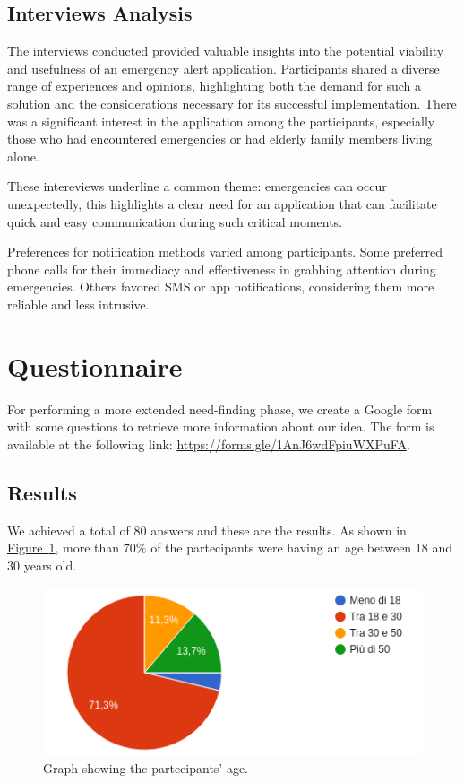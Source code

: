 \documentclass[12pt]{article}
\begin{document}
\subsection{Interviews Analysis}
The interviews conducted provided valuable insights into the potential 
viability and usefulness of an emergency alert application. Participants 
shared a diverse range of experiences and opinions, highlighting both the
demand for such a solution and the considerations necessary for its 
successful implementation. There was a significant interest in the 
application among the participants, especially those who had encountered 
emergencies or had elderly family members living alone.

These intereviews underline a common theme: emergencies can occur 
unexpectedly, this highlights a clear need for an application 
that can facilitate quick and easy communication during such critical 
moments.

Preferences for notification methods varied among participants. 
Some preferred phone calls for their immediacy and effectiveness in 
grabbing attention during emergencies. Others favored SMS or app 
notifications, considering them more reliable and less intrusive. 

\section{Questionnaire}
For performing a more extended need-finding phase, we create a Google form 
with some questions to retrieve more information about our idea. The form 
is available at the following link: \url{https://forms.gle/1AnJ6wdFpiuWXPuFA}.

\subsection{Results}
We achieved a total of 80 answers and these are the results. As shown in 
\hyperref[fig:age]{Figure~\ref*{fig:age}}, more than $70\%$ of the partecipants
were having an age between 18 and 30 years old. 
 
\begin{figure}[h]
    \centering
    \includegraphics[width=.5\textwidth]{Images/age.png}
    \caption{Graph showing the partecipants' age.}
    \label{fig:age}
\end{figure}
\end{document}
